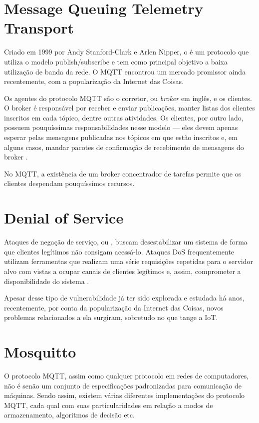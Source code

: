 
\section{Message Queuing Telemetry Transport}

Criado em 1999 por Andy Stanford-Clark e Arlen Nipper, o  é um protocolo que utiliza o modelo publish/subscribe e tem como principal objetivo a baixa utilização de banda da rede. O MQTT encontrou um mercado promissor ainda recentemente, com a popularização da Internet das Coisas.

Os agentes do protocolo MQTT são o corretor, ou \textit{broker} em inglês, e os clientes. O broker é responsável por receber e enviar publicações, manter listas dos clientes inscritos em cada tópico, dentre outras atividades. Os clientes, por outro lado, possuem pouquíssimas responsabilidades nesse modelo --- eles devem apenas esperar pelas mensagens publicadas nos tópicos em que estão inscritos e, em alguns casos, mandar pacotes de confirmação de recebimento de mensagens do broker \cite{OasisMQTT}.

No MQTT, a existência de um broker concentrador de tarefas permite que os clientes despendam pouquíssimos recursos.

\section{Denial of Service}
Ataques de negação de serviço, ou , buscam desestabilizar um sistema de forma que clientes legítimos não consigam acessá-lo. Ataques DoS frequentemente utilizam ferramentas que realizam uma série requisições repetidas para o servidor alvo com vistas a ocupar canais de clientes legítimos e, assim, comprometer a disponibilidade do sistema \cite{Douligeris2003}.

Apesar desse tipo de vulnerabilidade já ter sido explorada e estudada há anos, recentemente, por conta da popularização da Internet das Coisas, novos problemas relacionados a ela surgiram, sobretudo no que tange a IoT.


\section{Mosquitto}
O protocolo MQTT, assim como qualquer protocolo em redes de computadores, não é senão um conjunto de especificações padronizadas para comunicação de máquinas. Sendo assim, existem várias diferentes implementações do protocolo MQTT, cada qual com suas particularidades em relação a modos de armazenamento, algoritmos de decisão etc.

